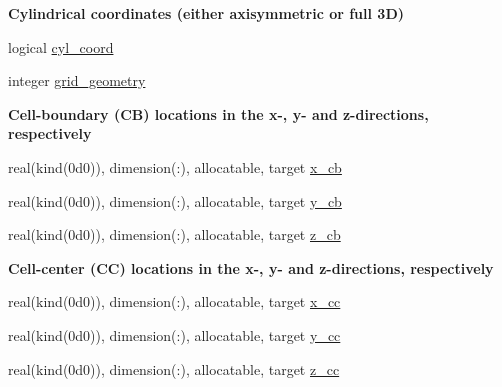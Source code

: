 \begin{Indent}\textbf{ Cylindrical coordinates (either axisymmetric or full 3D)}\par
\begin{DoxyCompactItemize}
\item 
logical \hyperlink{namespacem__global__parameters_a53f0d5eed7783c9760aaeeaa0abbd58c}{cyl\+\_\+coord}
\item 
integer \hyperlink{namespacem__global__parameters_a0f2d413d9739928f8e1a98f0a5783ab9}{grid\+\_\+geometry}
\end{DoxyCompactItemize}
\end{Indent}
\begin{Indent}\textbf{ Cell-\/boundary (CB) locations in the x-\/, y-\/ and z-\/directions, respectively}\par
\begin{DoxyCompactItemize}
\item 
real(kind(0d0)), dimension(\+:), allocatable, target \hyperlink{namespacem__global__parameters_a800c19cad11fe2774ac137b12ec89e33}{x\+\_\+cb}
\item 
real(kind(0d0)), dimension(\+:), allocatable, target \hyperlink{namespacem__global__parameters_a4bb8b661a170fc6ccd9fa3cc4b32c960}{y\+\_\+cb}
\item 
real(kind(0d0)), dimension(\+:), allocatable, target \hyperlink{namespacem__global__parameters_aa75fcd53fdc4fb58ca0fbc2cc9678673}{z\+\_\+cb}
\end{DoxyCompactItemize}
\end{Indent}
\begin{Indent}\textbf{ Cell-\/center (CC) locations in the x-\/, y-\/ and z-\/directions, respectively}\par
\begin{DoxyCompactItemize}
\item 
real(kind(0d0)), dimension(\+:), allocatable, target \hyperlink{namespacem__global__parameters_aea5b911d65b330f65e97052e9e8c0383}{x\+\_\+cc}
\item 
real(kind(0d0)), dimension(\+:), allocatable, target \hyperlink{namespacem__global__parameters_aaa584e01b4153d246d84eef286482632}{y\+\_\+cc}
\item 
real(kind(0d0)), dimension(\+:), allocatable, target \hyperlink{namespacem__global__parameters_a9fef803dde37fd067fd4b2215df851b9}{z\+\_\+cc}
\end{DoxyCompactItemize}
\end{Indent}

